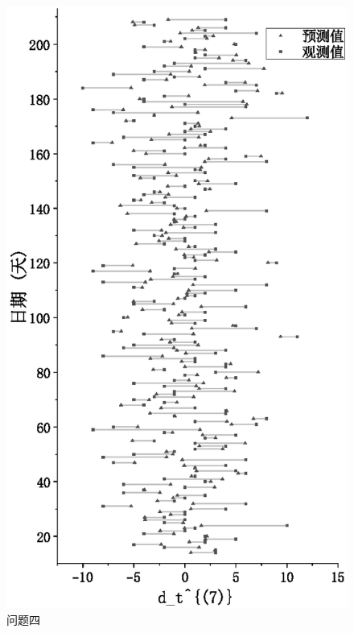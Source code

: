 \begin{figure}[!htbp]
	\centering
	\includegraphics{Image/问题四展示.eps}
	\caption{问题四}\label{问题四}
\end{figure}
